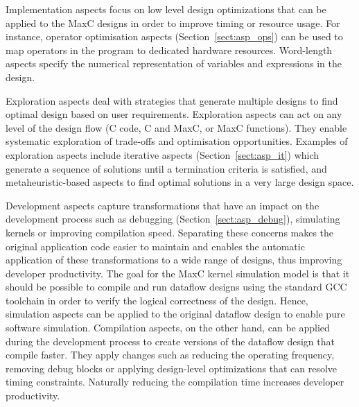 \vspace*{0.5ex}
 Implementation aspects focus on low level design optimizations that can be applied to the MaxC designs in order to improve timing or resource usage. For instance, operator optimisation aspects (Section~\ref{sect:asp_ops}) can be used to map operators in the program to dedicated hardware resources. Word-length aspects
specify the numerical representation of variables and expressions in the design.

\vspace*{0.5ex}
 Exploration aspects deal with strategies that generate multiple designs to find optimal design based on user requirements. Exploration aspects can act on any level of the design flow (C code, C and MaxC, or MaxC functions). They enable
systematic exploration of trade-offs and optimisation opportunities. Examples of exploration aspects include iterative aspects (Section~\ref{sect:asp_it}) which generate a sequence of solutions until a termination criteria is satisfied, and metaheuristic-based aspects to find optimal solutions in a very large design space.

\vspace*{0.5ex}
 Development aspects capture transformations that have an impact on the
development process such as debugging (Section~\ref{sect:asp_debug}), simulating kernels or improving
compilation speed. Separating these concerns makes the original
application code easier to maintain and enables the automatic
application of these transformations to a wide range of designs, thus
improving developer productivity. The goal for the MaxC kernel simulation model is that it should be possible to compile and run dataflow designs using the standard GCC
toolchain in order to verify the logical correctness of the
design. Hence, simulation aspects can be applied to the original dataflow design to
enable pure software simulation. Compilation aspects, on the other hand, can be applied during the development process to create versions of the dataflow design that compile faster. They apply
changes such as reducing the operating frequency, removing debug
blocks or applying design-level optimizations that can resolve timing
constraints. Naturally reducing the compilation time increases
developer productivity.


